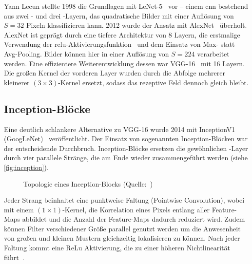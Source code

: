 Yann Lecun stellte 1998 die Grundlagen mit LeNet-5~\cite{Lecun98} vor -- einem \gls{cnn} bestehend aus zwei \conv- und drei \fc-Layern, das quadratische Bilder mit einer Auflösung von $S=32$ Pixeln klassifizieren kann.
2012 wurde der Ansatz mit AlexNet~\cite{Krizhevsky12} überholt.
AlexNet ist geprägt durch eine tiefere Architektur von 8 Layern, die erstmalige Verwendung der \gls{relu}-Aktivierungsfunktion~\cite{jarrett09} und dem Einsatz von Max- statt Avg-Pooling.
Bilder können hier in einer Auflösung von $S=224$ verarbeitet werden.
Eine effizientere Weiterentwicklung dessen war VGG-16~\cite{Simonyan15} mit 16 Layern.
Die großen Kernel der vorderen Layer wurden durch die Abfolge mehrerer kleinerer $(3 \times 3)$-Kernel ersetzt, sodass das rezeptive Feld dennoch gleich bleibt.


\subsection{Inception-Blöcke}
\label{subsec:inception-bloecke}

Eine deutlich schlankere Alternative zu VGG-16 wurde 2014 mit InceptionV1 (GoogLeNet)~\cite{Szegedy14} veröffentlicht.
Der Einsatz von sogenannten Inception-Blöcken war der entscheidende Durchbruch.
Inception-Blöcke ersetzen die gewöhnlichen \conv-Layer durch vier parallele Stränge, die am Ende wieder zusammengeführt werden (siehe \autoref{fig:inception}).

\begin{figure}[hb!]
    \centering
    \caption[Topologie eines Inception-Blocks]{Topologie eines Inception-Blocks (Quelle:~\cite{Karim19})}
    \label{fig:inception}
\end{figure}

Jeder Strang beinhaltet eine punktweise Faltung (Pointwise Convolution), wobei mit einem $(1 \times 1)$-Kernel, die Korrelation eines Pixels entlang aller Feature-Maps abbildet und die Anzahl der Feature-Maps dadurch reduziert wird.
Zudem können Filter verschiedener Größe parallel genutzt werden um die Anwesenheit von großen und kleinen Mustern gleichzeitig lokalisieren zu können.
Nach jeder Faltung kommt eine ReLu Aktivierung, die zu einer höheren Nichtlinearität führt~\cite{Pointer19}.

